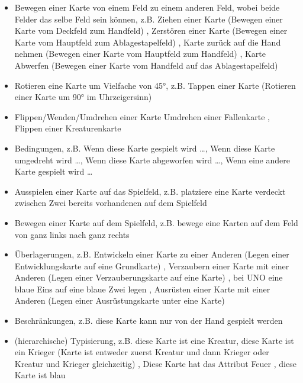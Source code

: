 \documentclass[fontsize=12]{scrartcl}
\begin{document}
	\begin{itemize}
		
		\item Bewegen einer Karte von einem Feld zu einem anderen Feld, wobei beide Felder das selbe Feld sein können, z.B. \glqq Ziehen einer Karte (Bewegen einer Karte vom Deckfeld zum Handfeld) \grqq, \glqq Zerstören einer Karte (Bewegen einer Karte vom Hauptfeld zum Ablagestapelfeld) \grqq, \glqq Karte zurück auf die Hand nehmen (Bewegen einer Karte vom Hauptfeld zum Handfeld) \grqq, \glqq Karte Abwerfen (Bewegen einer Karte vom Handfeld auf das Ablagestapelfeld) \grqq
		
		\item Rotieren eine Karte um Vielfache von 45°, z.B. \glqq Tappen einer Karte (Rotieren einer Karte um 90° im Uhrzeigersinn)\grqq
		
		\item Flippen/Wenden/Umdrehen einer Karte \glqq Umdrehen einer Fallenkarte \grqq, \glqq Flippen einer Kreaturenkarte \grqq
		
		\item Bedingungen, z.B. \glqq Wenn diese Karte gespielt wird \dots \grqq, \glqq Wenn diese Karte umgedreht wird \dots \grqq, \glqq Wenn diese Karte abgeworfen wird \dots \grqq, \glqq Wenn eine andere Karte gespielt wird \dots \grqq
		
		\item Ausspielen einer Karte auf das Spielfeld, z.B. \glqq platziere eine Karte verdeckt zwischen Zwei bereits vorhandenen auf dem Spielfeld \grqq
		
		\item Bewegen einer Karte auf dem Spielfeld, z.B. \glqq bewege eine Karten auf dem Feld von ganz links nach ganz rechts \grqq
		
		\item Überlagerungen, z.B. \glqq Entwickeln einer Karte zu einer Anderen (Legen einer Entwicklungskarte auf eine Grundkarte) \grqq, \glqq Verzaubern einer Karte mit einer Anderen (Legen einer Verzauberungskarte auf eine Karte) \grqq, \glqq bei UNO eine blaue Eins auf eine blaue Zwei legen \grqq, \glqq Ausrüsten einer Karte mit einer Anderen (Legen einer Ausrüstungskarte unter eine Karte) \grqq
		
		\item Beschränkungen, z.B. \glqq diese Karte kann nur von der Hand gespielt werden \grqq
		
		\item (hierarchische) Typisierung, z.B. \glqq diese Karte ist eine Kreatur, diese Karte ist ein Krieger (Karte ist entweder zuerst Kreatur und dann Krieger oder Kreatur und Krieger gleichzeitig) \grqq, \glqq Diese Karte hat das Attribut Feuer \grqq, \glqq diese Karte ist blau \grqq
		

\end{itemize}
\end{document}
